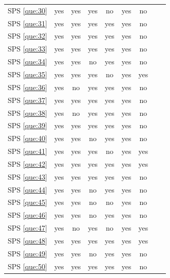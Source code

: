 \documentclass[sensors,review,accept,moreauthors,pdftex]{Definitions/mdpi}
\begin{document}
\begin{table}[H]
\begin{tabular}{ccccccccc}
		SPS \ref{que:30}& yes & yes& yes& no& yes& no\\
		
		SPS \ref{que:31}& yes & yes& yes& yes& yes& no\\
		
		SPS \ref{que:32}& yes & yes& yes& yes& yes& no\\
		
		SPS \ref{que:33}& yes & yes& yes& yes& yes& no\\
		
		SPS \ref{que:34}&	yes	&	yes	&	no	&	yes	&	yes	&	no	\\
		
		SPS \ref{que:35}&	yes	&	yes	&	yes	&	no	&	yes	&	yes	\\
		
		SPS \ref{que:36}&	yes	&	no	&	yes	&	yes	&	yes	&	no	\\
		
		SPS \ref{que:37}&	yes	&	yes	&	yes	&	yes	&	yes	&	no	\\
		
		SPS \ref{que:38}&	yes	&	no	&	yes	&	yes	&	yes	&	no	\\
		
		SPS \ref{que:39}&	yes	&	yes	&	yes	&	yes	&	yes	&	no	\\
		
		SPS \ref{que:40}&	yes	&	yes	&	no	&	yes	&	yes	&	no	\\
		
		SPS \ref{que:41}&	yes	&	yes	&	yes	&	no	&	yes	&	yes	\\
		
		SPS \ref{que:42}&	yes	&	yes	&	yes	&	yes	&	yes	&	yes	\\
		SPS \ref{que:43}&	yes	&	yes	&	yes	&	yes	&	yes	&	no	\\
		
		SPS \ref{que:44}&	yes	&	yes	&	no	&	yes	&	yes	&	no	\\
		
		SPS \ref{que:45}&	yes	&	yes	&	no	&	no	&	yes	&	no	\\
		
		SPS \ref{que:46}&	yes	&	yes	&	no	&	yes	&	yes	&	no	\\
		
		SPS \ref{que:47}&	yes	&	no	&	yes	&	no	&	yes	&	yes	\\
		
		SPS \ref{que:48}&	yes	&	yes	&	yes	&	yes	&	yes	&	yes	\\
		
		SPS \ref{que:49}&	yes	&	yes	&	no	&	yes	&	yes	&	no	\\
		
		SPS \ref{que:50}&	yes	&	yes	&	yes	&	yes	&	yes	&	no	\\
		
		
		\bottomrule
	\end{tabular}
\end{table}
\end{document}
